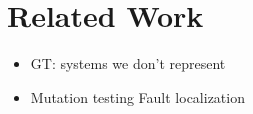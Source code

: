 \section{Related Work}

\begin{itemize}
  \item  GT: systems we don't represent
  \item Mutation testing
  \itme Fault localization
\end{itemize}    

